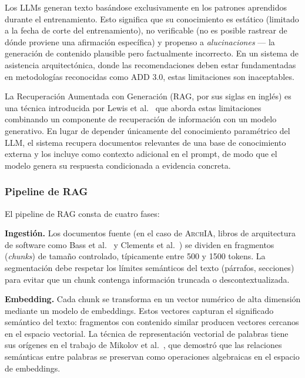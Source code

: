 \documentclass[12pt, letterpaper, oneside]{article}
\newcommand{\archia}{\textsc{ArchIA}}
\begin{document}

Los LLMs generan texto basándose exclusivamente en los patrones aprendidos durante
el entrenamiento. Esto significa que su conocimiento es estático (limitado a la
fecha de corte del entrenamiento), no verificable (no es posible rastrear de dónde
proviene una afirmación específica) y propenso a \emph{alucinaciones} --- la
generación de contenido plausible pero factualmente incorrecto. En un sistema de
asistencia arquitectónica, donde las recomendaciones deben estar fundamentadas en
metodologías reconocidas como ADD 3.0, estas limitaciones son inaceptables.

La Recuperación Aumentada con Generación (RAG, por sus siglas en inglés) es una
técnica introducida por Lewis et al.~\cite{lewis2020retrieval} que aborda estas
limitaciones combinando un componente de recuperación de información con un modelo
generativo. En lugar de depender únicamente del conocimiento paramétrico del LLM,
el sistema recupera documentos relevantes de una base de conocimiento externa y los
incluye como contexto adicional en el prompt, de modo que el modelo genera su
respuesta condicionada a evidencia concreta.

\subsubsection{Pipeline de RAG}

El pipeline de RAG consta de cuatro fases:

\textbf{Ingestión.} Los documentos fuente (en el caso de \archia{}, libros de
arquitectura de software como Bass et al.~\cite{bass2021software} y Clements
et al.~\cite{clements2002evaluating}) se dividen en fragmentos (\emph{chunks}) de
tamaño controlado, típicamente entre 500 y 1500 tokens. La segmentación debe
respetar los límites semánticos del texto (párrafos, secciones) para evitar que un
chunk contenga información truncada o descontextualizada.

\textbf{Embedding.} Cada chunk se transforma en un vector numérico de alta
dimensión mediante un modelo de embeddings. Estos vectores capturan el significado
semántico del texto: fragmentos con contenido similar producen vectores cercanos en
el espacio vectorial. La técnica de representación vectorial de palabras tiene sus
orígenes en el trabajo de Mikolov et al.~\cite{mikolov2013efficient}, que demostró
que las relaciones semánticas entre palabras se preservan como operaciones
algebraicas en el espacio de embeddings.
\end{document}
